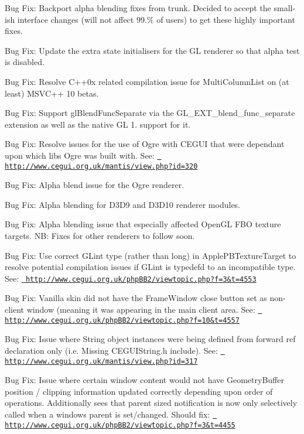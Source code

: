 \begin{DoxyItemize}
\item Bug Fix\+: Backport alpha blending fixes from trunk. Decided to accept the small-\/ish interface changes (will not affect 99.\% of users) to get these highly important fixes.
\item Bug Fix\+: Update the \textquotesingle{}extra\textquotesingle{} state initialisers for the GL renderer so that alpha test is disabled.
\item Bug Fix\+: Resolve C++0x related compilation issue for Multi\+Column\+List on (at least) M\+S\+V\+C++ 10 betas.
\item Bug Fix\+: Support gl\+Blend\+Func\+Separate via the G\+L\+\_\+\+E\+X\+T\+\_\+blend\+\_\+func\+\_\+separate extension as well as the native GL 1. support for it.
\item Bug Fix\+: Resolve issues for the use of Ogre with C\+E\+G\+UI that were dependant upon which libs Ogre was built with. See\+: \href{http://www.cegui.org.uk/mantis/view.php?id=320}{\texttt{ http\+://www.\+cegui.\+org.\+uk/mantis/view.\+php?id=320}}
\item Bug Fix\+: Alpha blend issue for the Ogre renderer.
\item Bug Fix\+: Alpha blending for D3\+D9 and D3\+D10 renderer modules.
\item Bug Fix\+: Alpha blending issue that especially affected Open\+GL F\+BO texture targets. NB\+: Fixes for other renderers to follow soon.
\item Bug Fix\+: Use correct G\+Lint type (rather than long) in Apple\+P\+B\+Texture\+Target to resolve potential compilation issues if G\+Lint is typedef\textquotesingle{}d to an incompatible type. See\+: \href{http://www.cegui.org.uk/phpBB2/viewtopic.php?f=3&t=4553}{\texttt{ http\+://www.\+cegui.\+org.\+uk/php\+B\+B2/viewtopic.\+php?f=3\&t=4553}}
\item Bug Fix\+: Vanilla skin did not have the Frame\+Window close button set as non-\/client window (meaning it was appearing in the main client area. See\+: \href{http://www.cegui.org.uk/phpBB2/viewtopic.php?f=10&t=4557}{\texttt{ http\+://www.\+cegui.\+org.\+uk/php\+B\+B2/viewtopic.\+php?f=10\&t=4557}}
\item Bug Fix\+: Issue where String object instances were being defined from forward ref declaration only (i.\+e. Missing C\+E\+G\+U\+I\+String.\+h include). See\+: \href{http://www.cegui.org.uk/mantis/view.php?id=317}{\texttt{ http\+://www.\+cegui.\+org.\+uk/mantis/view.\+php?id=317}}
\item Bug Fix\+: Issue where certain window content would not have Geometry\+Buffer position / clipping information updated correctly depending upon order of operations. Additionally sees that parent sized notification is now only selectively called when a window\textquotesingle{}s parent is set/changed. Should fix\+: \href{http://www.cegui.org.uk/phpBB2/viewtopic.php?f=3&t=4455}{\texttt{ http\+://www.\+cegui.\+org.\+uk/php\+B\+B2/viewtopic.\+php?f=3\&t=4455}}

\end{DoxyItemize}
